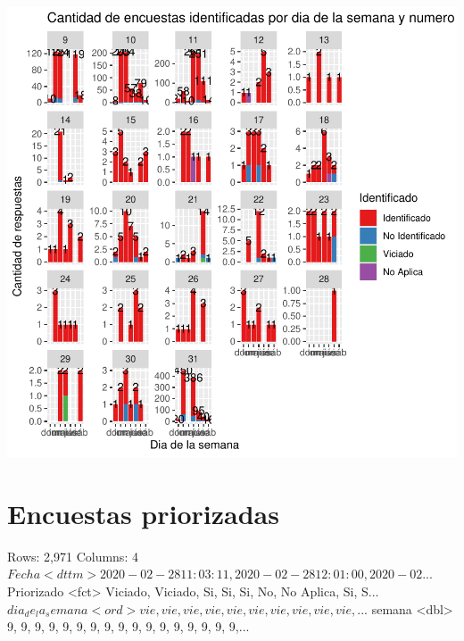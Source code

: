 \documentclass{article}
\begin{document}
\includegraphics{seguimientov5-028}


\section{Encuestas priorizadas}

\begin{Schunk}
\begin{Soutput}
Rows: 2,971
Columns: 4
$ Fecha            <dttm> 2020-02-28 11:03:11, 2020-02-28 12:01:00, 2020-02...
$ Priorizado       <fct> Viciado, Viciado, Si, Si, Si, No, No Aplica, Si, S...
$ dia_de_la_semana <ord> vie, vie, vie, vie, vie, vie, vie, vie, vie, vie, ...
$ semana           <dbl> 9, 9, 9, 9, 9, 9, 9, 9, 9, 9, 9, 9, 9, 9, 9, 9, 9,...
\end{Soutput}
\end{Schunk}
\end{document}
